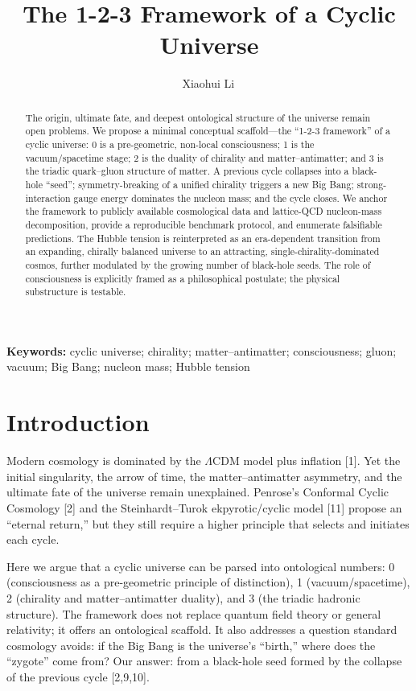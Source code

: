 \documentclass[11pt,a4paper]{article}
\title{\textbf{The 1-2-3 Framework of a Cyclic Universe}}
\author[1]{Xiaohui Li\,\orcidlink{0009-0003-8233-7191}}
\affil[1]{Independent Researcher, Baoji, China}
\affil[*]{Correspondence: Xiaohui Li (email: danceluck@163.com)}
\date{}
\begin{document}
\maketitle

\begin{abstract}
The origin, ultimate fate, and deepest ontological structure of the universe remain open problems. We propose a minimal conceptual scaffold---the ``1-2-3 framework'' of a cyclic universe: 0 is a pre-geometric, non-local consciousness; 1 is the vacuum/spacetime stage; 2 is the duality of chirality and matter--antimatter; and 3 is the triadic quark--gluon structure of matter. A previous cycle collapses into a black-hole ``seed''; symmetry-breaking of a unified chirality triggers a new Big Bang; strong-interaction gauge energy dominates the nucleon mass; and the cycle closes. We anchor the framework to publicly available cosmological data and lattice-QCD nucleon-mass decomposition, provide a reproducible benchmark protocol, and enumerate falsifiable predictions. The Hubble tension is reinterpreted as an era-dependent transition from an expanding, chirally balanced universe to an attracting, single-chirality-dominated cosmos, further modulated by the growing number of black-hole seeds. The role of consciousness is explicitly framed as a philosophical postulate; the physical substructure is testable.
\end{abstract}

\noindent\textbf{Keywords:} cyclic universe; chirality; matter--antimatter; consciousness; gluon; vacuum; Big Bang; nucleon mass; Hubble tension

\section{Introduction}
Modern cosmology is dominated by the $\Lambda$CDM model plus inflation [1]. Yet the initial singularity, the arrow of time, the matter--antimatter asymmetry, and the ultimate fate of the universe remain unexplained. Penrose's Conformal Cyclic Cosmology [2] and the Steinhardt--Turok ekpyrotic/cyclic model [11] propose an ``eternal return,'' but they still require a higher principle that selects and initiates each cycle.

Here we argue that a cyclic universe can be parsed into ontological numbers: 0 (consciousness as a pre-geometric principle of distinction), 1 (vacuum/spacetime), 2 (chirality and matter--antimatter duality), and 3 (the triadic hadronic structure). The framework does not replace quantum field theory or general relativity; it offers an ontological scaffold. It also addresses a question standard cosmology avoids: if the Big Bang is the universe's ``birth,'' where does the ``zygote'' come from? Our answer: from a black-hole seed formed by the collapse of the previous cycle [2,9,10].
\end{document}

